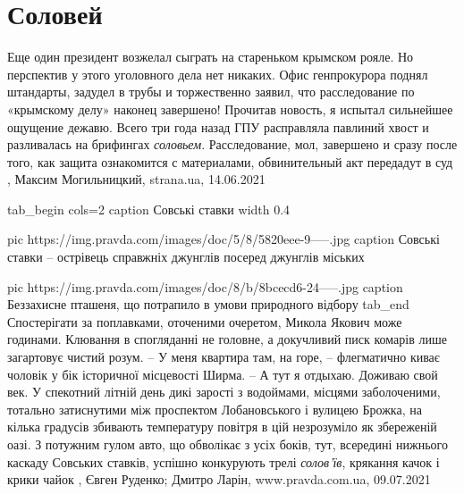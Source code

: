 
 
 
 
 
\chapter{Соловей}
\label{sec:slova.solovej}

Еще один президент возжелал сыграть на стареньком крымском рояле. Но
перспектив у этого уголовного дела нет никаких. Офис генпрокурора поднял
штандарты, задудел в трубы и торжественно заявил, что расследование по
«крымскому делу» наконец завершено! Прочитав новость, я испытал сильнейшее
ощущение дежавю. Всего три года назад ГПУ расправляла павлиний хвост и
разливалась на брифингах \emph{соловьем}. Расследование, мол, завершено и сразу
после того, как защита ознакомится с материалами, обвинительный акт передадут в
суд
, 
Максим Могильницкий, strana.ua, 14.06.2021

\ifcmt
tab_begin cols=2
	caption Совські ставки
	width 0.4

  pic https://img.pravda.com/images/doc/5/8/5820eee-9-----.jpg
	caption Совські ставки – острівець справжніх джунглів посеред джунглів міських

	pic https://img.pravda.com/images/doc/8/b/8bcecd6-24-----.jpg
	caption Беззахисне пташеня, що потрапило в умови природного відбору
tab_end
\fi
Спостерігати за поплавками, оточеними очеретом, Микола Якович може годинами.
Клювання в спогляданні не головне, а докучливий писк комарів лише загартовує
чистий розум.  – У меня квартира там, на горе, – флегматично киває чоловік у
бік історичної місцевості Ширма. – А тут я отдыхаю. Доживаю свой век.  У
спекотний літній день дикі зарості з водоймами, місцями заболоченими, тотально
затиснутими між проспектом Лобановського і вулицею Брожка, на кілька градусів
збивають температуру повітря в цій незрозуміло як збереженій оазі.  З потужним
гулом авто, що обволікає з усіх боків, тут, всередині нижнього каскаду Совських
ставків, успішно конкурують трелі \emph{солов'їв}, крякання качок і крики чайок
, 
Євген Руденко; Дмитро Ларін, www.pravda.com.ua, 09.07.2021

